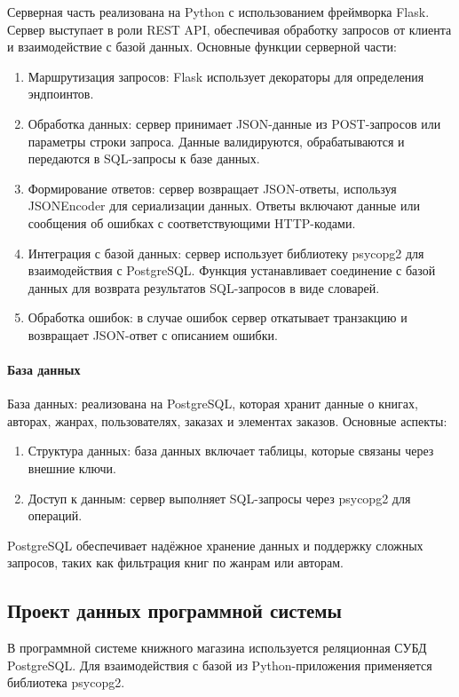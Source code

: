Серверная часть реализована на Python с использованием фреймворка Flask. Сервер выступает в роли REST API, обеспечивая обработку запросов от клиента и взаимодействие с базой данных. Основные функции серверной части:
	\begin{enumerate}
		\item Маршрутизация запросов: Flask использует декораторы для определения эндпоинтов.
		\item Обработка данных: сервер принимает JSON-данные из POST-запросов или параметры строки запроса. Данные валидируются, обрабатываются и передаются в SQL-запросы к базе данных.
		\item Формирование ответов: сервер возвращает JSON-ответы, используя JSONEncoder для сериализации данных. Ответы включают данные или сообщения об ошибках с соответствующими HTTP-кодами.
		\item Интеграция с базой данных: сервер использует библиотеку psycopg2 для взаимодействия с PostgreSQL. Функция устанавливает соединение с базой данных для возврата результатов SQL-запросов в виде словарей.
		\item Обработка ошибок: в случае ошибок сервер откатывает транзакцию и возвращает JSON-ответ с описанием ошибки.
	\end{enumerate}

\paragraph{База данных}

База данных: реализована на PostgreSQL, которая хранит данные о книгах, авторах, жанрах, пользователях, заказах и элементах заказов. Основные аспекты:
	\begin{enumerate}
		\item Структура данных: база данных включает таблицы, которые связаны через внешние ключи.
		\item Доступ к данным: сервер выполняет SQL-запросы через psycopg2 для операций.
	\end{enumerate}
	
	PostgreSQL обеспечивает надёжное хранение данных и поддержку сложных запросов, таких как фильтрация книг по жанрам или авторам.

\subsection{Проект данных программной системы}

В программной системе книжного магазина используется реляционная СУБД PostgreSQL. Для взаимодействия с базой из Python-приложения применяется библиотека psycopg2.

